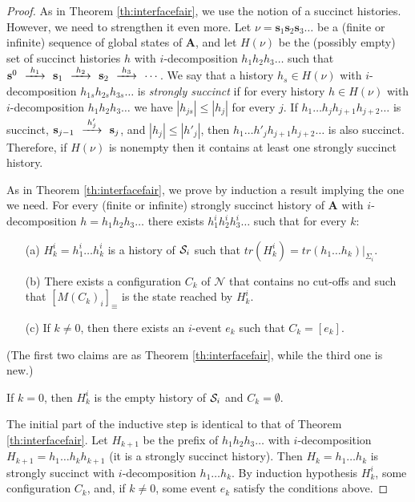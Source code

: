 \documentclass{llncs}
\def\prod{\mathbf{A}}
\def\s{\mathbf{s}}
\def\N{\mathcal{N}}
\def\S{\mathcal{S}}
\newcommand{\ma}[1]{M(#1)}
\renewcommand{\S}{{\cal S}}
\def\trace{tr}
\def\by#1{\mathop{{\hbox{\setbox0=\hbox{$\scriptstyle{#1\quad}$}{$\buildrel{\quad\scriptstyle{#1}\quad}\over{\hbox to \wd0{\rightarrowfill}}$}}}}}
\begin{document}
\begin{proof}
As in Theorem \ref{th:interfacefair}, we use the notion of a succinct histories. However, we need
to strengthen it even more. Let $\nu=\s_1\s_2\s_3 \ldots$ be a (finite or infinite) sequence of
global states of $\prod$, and let $H(\nu)$ be the (possibly empty) set of 
succinct histories $h$ with $i$-decomposition
$h_1h_2h_3 \ldots$ such that $\s^0 \by{h_1} \s_1 \by{h_2} \s_2 \by{h_3}\cdots$. 
We say that a history $h_s \in H(\nu)$ with $i$-decomposition $h_{1s}h_{2s}h_{3s}\ldots$
is {\em strongly succinct} if for every history $h \in H(\nu)$ with $i$-decomposition
$h_1h_2h_3 \ldots$ we have $|h_{js}|\leq |h_j|$ for every $j$.
If $h_1 \ldots h_jh_{j+1}h_{j+2} \ldots$ is succinct, $\s_{j-1} \by{h'_j} \s_j$, and 
$|h_{j}|\leq |h'_j|$, then $h_1 \ldots h'_jh_{j+1}h_{j+2} \ldots$ is also succinct. Therefore,
if $H(\nu)$ is nonempty then it contains at least one strongly succinct history.

As in Theorem \ref{th:interfacefair}, we prove by induction a result implying the one we need.
For every (finite or infinite) strongly succinct history of $\prod$ with $i$-decomposition $h=h_1h_2h_3 \ldots$
there exists $h_1^ih_2^ih_3^i\dots$ such that for every $k$:
\begin{enumerate}
\item[(a)] $H_k^i=h_1^i\dots h_k^i$ is a history of $\S_i$ such that $\trace(H_k^i)=\trace(h_1\dots h_k)|_{\Sigma_i}$.
\item[(b)] There exists a configuration $C_k$ of $\N$ that contains no cut-offs and such that
$[\ma{C_k}_i]_\equiv$ is the state reached by $H_k^i$. 
\item[(c)] If $k\neq 0$, then there exists an $i$-event $e_k$ such that $C_k=[e_k]$. 
\end{enumerate}
\noindent (The first two claims are as Theorem \ref{th:interfacefair}, while the third one is new.)

If $k=0$, then $H_k^i$ is the empty history of $\S_i$ and $C_k = \emptyset$.

The initial part of the inductive step is identical to that of Theorem \ref{th:interfacefair}. 
Let $H_{k+1}$ be the prefix of $h_1h_2h_3\dots$ with $i$-decomposition $H_{k+1}=h_1 \ldots h_k h_{k+1}$ (it is a strongly succinct history).
Then $H_k = h_1 \ldots h_k$ is strongly succinct with $i$-decomposition $h_1 \ldots h_k$. 
By induction hypothesis $H_k^i$, some configuration $C_{k}$,
and, if $k\neq 0$, some event $e_{k}$ satisfy the conditions above. 


\end{proof}
\end{document}

